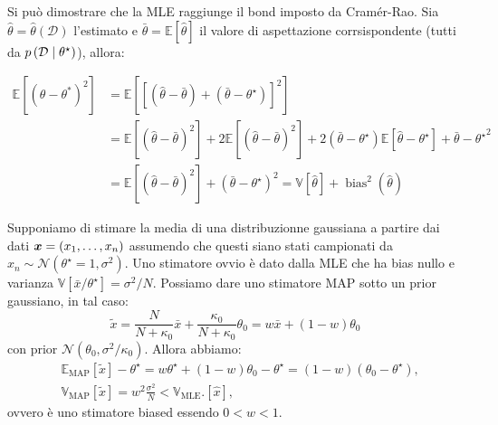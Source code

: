 \documentclass[10pt]{article}
\DeclareMathOperator{\bias}{bias}
\begin{document}
    Si può dimostrare che la MLE raggiunge il bond imposto da Cramér-Rao. Sia
    \( \hat{\theta} = \hat{\theta} \left( \mathcal{D} \right) \) l'estimato e \(
    \bar{\theta} = \mathbb{E} \left[ \hat{\theta} \right] \) il valore di
    aspettazione corrsispondente (tutti da \(p \left(
    \mathcal{D}\mid\theta^\star \right) \)), allora:

    \begin{equation}
        \begin{split}
            \mathbb{E} \left[ {\left( \hat{\theta} - \theta^* \right)}^2 \right] &= \mathbb{E} \left[ {\left[ ( \hat{\theta} - \bar{\theta} ) + ( \bar{\theta} - \theta^\star )\right]}^2 \right] \\
            &= \mathbb{E} \left[ {\left( \hat{\theta} - \bar{\theta} \right)}^2 \right] + 2\mathbb{E} \left[ {\left( \hat{\theta}-\bar{\theta} \right)}^2 \right] + 2\left( \bar{\theta} - \theta^\star \right)\mathbb{E} \left[ \hat{\theta} - \theta^\star \right] + {\bar{\theta}-\theta^\star}^2 \\
            &= \mathbb{E} \left[ {\left( \hat{\theta} - \bar{\theta} \right)}^2 \right]  + {\left( \bar{\theta} - \theta^\star \right)}^2 = \mathbb{V}\left[\hat{\theta}\right] + \bias^2 \left( \hat{\theta} \right)
        \end{split}
    \end{equation}

    \begin{example}
        Supponiamo di stimare la media di una distribuzionne gaussiana a partire dai dati
        \mbox{\( \bm{x} = \left( x_1, \ldots, x_n \right) \)} assumendo che questi siano stati campionati da
        \( x_n \sim \mathcal{N} \left( \theta^\star = 1, \sigma^2 \right) \). Uno stimatore ovvio è dato dalla MLE
        che ha bias nullo e varianza \( \mathbb{V} [\bar{x}/\theta^\star] = \sigma^2/N \).
        Possiamo dare uno stimatore MAP sotto un prior gaussiano, in tal caso:
        \[
            \tilde{x} = \frac{N}{N + \kappa_0} \bar{x} + \frac{\kappa_0}{N + \kappa_0}\theta_0 = w\bar{x} + \left( 1-w \right) \theta_0
        \]
        con prior \( \mathcal{N} \left( \theta_0, \sigma^2 / \kappa_0 \right) \). Allora abbiamo:
        \begin{align*}
            &\mathbb{E}_{\text{MAP}} \left[ \tilde{x} \right] - \theta^\star = w\theta^\star + (1 - w)\theta_0 - \theta^\star = \left( 1-w \right) \left( \theta_0 - \theta^\star \right),  \\
            &\mathbb{V}_{\text{MAP}} \left[ \tilde{x} \right] = w^2\frac{\sigma^2}{N} < \mathbb{V}_\text{MLE} .\left[ \hat{x} \right],
        \end{align*}
        ovvero è uno stimatore biased essendo \( 0 < w < 1\).
    \end{example}
\end{document}

